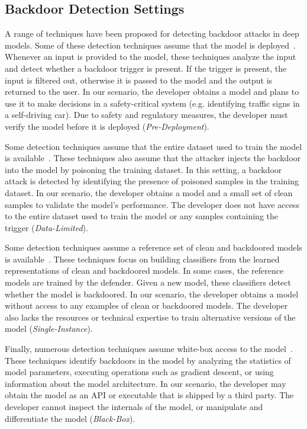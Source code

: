 \documentclass[letterpaper,twocolumn,10pt]{article}
\begin{document}
\subsection{Backdoor Detection Settings}
\label{sec:background-detection}
A range of techniques have been proposed for detecting backdoor attacks in deep models. Some of these detection techniques assume that the model is deployed~\cite{udeshi2022model, veldanda2021nnoculation, guo2023scale, gao2019strip, doan2020februus}. Whenever an input is provided to the model, these techniques analyze the input and detect whether a backdoor trigger is present. If the trigger is present, the input is filtered out, otherwise it is passed to the model and the output is returned to the user. In our scenario, the developer obtains a model and plans to use it to make decisions in a safety-critical system (e.g. identifying traffic signs in a self-driving car). Due to safety and regulatory measures, the developer must verify the model before it is deployed (\textit{Pre-Deployment}).

Some detection techniques assume that the entire dataset used to train the model is available~\cite{kraus2024labels, tran2018spectral, chen2018activation, pan2023asset, zhang2021topological, qi2023proactive}. These techniques also assume that the attacker injects the backdoor into the model by poisoning the training dataset. In this setting, a backdoor attack is detected by identifying the presence of poisoned samples in the training dataset. In our scenario, the developer obtains a model and a small set of clean samples to validate the model's performance. The developer does not have access to the entire dataset used to train the model or any samples containing the trigger (\textit{Data-Limited}).

Some detection techniques assume a reference set of clean and backdoored models is available~\cite{xu2021mntd, kolouri2020litmus, veldanda2021nnoculation}. These techniques focus on building classifiers from the learned representations of clean and backdoored models. In some cases, the reference models are trained by the defender. Given a new model, these classifiers detect whether the model is backdoored. In our scenario, the developer obtains a model without access to any examples of clean or backdoored models. The developer also lacks the resources or technical expertise to train alternative versions of the model (\textit{Single-Instance}). 

Finally, numerous detection techniques assume white-box access to the model~\cite{gao2019cost, liu2019abs, wang2020datafree, fu2023eagle, tao2022pixel, wang2019cleanse, chou2020sentinet}. These techniques identify backdoors in the model by analyzing the statistics of model parameters, executing operations such as gradient descent, or using information about the model architecture. In our scenario, the developer may obtain the model as an API or executable that is shipped by a third party. The developer cannot inspect the internals of the model, or manipulate and differentiate the model (\textit{Black-Box}).
\end{document}
